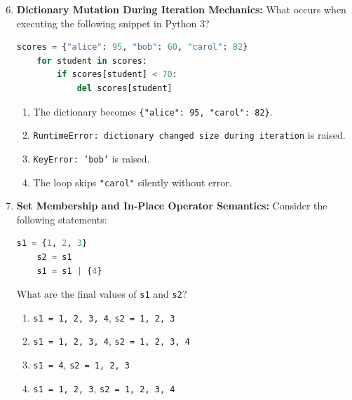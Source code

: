 \begin{enumerate}
    \setcounter{enumi}{5}
    \item \textbf{Dictionary Mutation During Iteration Mechanics:}
    What occurs when executing the following snippet in Python 3?
    \begin{lstlisting}[language=Python]
    scores = {"alice": 95, "bob": 60, "carol": 82}
    for student in scores:
        if scores[student] < 70:
            del scores[student]
    \end{lstlisting}
    \begin{enumerate}
        \item The dictionary becomes \texttt{\{"alice": 95, "carol": 82\}}.
        \item \texttt{RuntimeError: dictionary changed size during iteration} is raised.
        \item \texttt{KeyError: 'bob'} is raised.
        \item The loop skips \texttt{"carol"} silently without error.
    \end{enumerate}

    \item \textbf{Set Membership and In-Place Operator Semantics:}
    Consider the following statements:
    \begin{lstlisting}[language=Python]
    s1 = {1, 2, 3}
    s2 = s1
    s1 = s1 | {4}
    \end{lstlisting}
    What are the final values of \texttt{s1} and \texttt{s2}?
    \begin{enumerate}
        \item \texttt{s1 = {1, 2, 3, 4}}, \quad \texttt{s2 = {1, 2, 3}}
        \item \texttt{s1 = {1, 2, 3, 4}}, \quad \texttt{s2 = {1, 2, 3, 4}}
        \item \texttt{s1 = {4}}, \quad \texttt{s2 = {1, 2, 3}}
        \item \texttt{s1 = {1, 2, 3}}, \quad \texttt{s2 = {1, 2, 3, 4}}
    \end{enumerate}
\end{enumerate}

